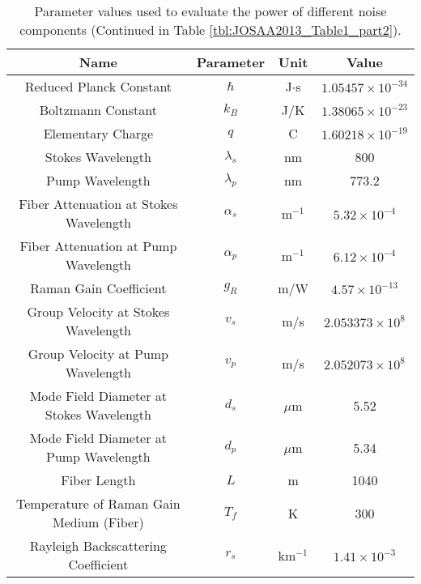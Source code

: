 \begin{table}[t]
\begin{centering}
\begin{tabular}{|c|c|c|c|} \hline
Name & Parameter & Unit & Value\\ \hline\hline
Reduced Planck Constant & $\hbar$ & J$\cdot$s & $1.05457 \times 10^{-34}$ \\ \hline
Boltzmann Constant & $k_B$ & J/K & $1.38065 \times 10^{-23}$  \\ \hline
Elementary Charge & $q$ & C & $1.60218 \times 10^{-19}$  \\ \hline 
Stokes Wavelength & $\lambda_s$ & nm & 800 \\ \hline
Pump Wavelength & $\lambda_p$ & nm & 773.2 \\ \hline
Fiber Attenuation at Stokes Wavelength & $\alpha_s$ & m$^{-1}$ & $5.32 \times 10^{-4}$ \\ \hline
Fiber Attenuation at Pump Wavelength & $\alpha_p$ & m$^{-1}$ & $6.12 \times 10^{-4}$ \\ \hline
Raman Gain Coefficient & $g_R$ & m/W & $4.57 \times 10^{-13}$ \\ \hline
Group Velocity at Stokes Wavelength & $v_s$ & m/s & $2.053373 \times 10^8$ \\ \hline
Group Velocity at Pump Wavelength & $v_p$ & m/s & $2.052073 \times 10^8$ \\ \hline
Mode Field Diameter at Stokes Wavelength & $d_s$ & $\mu$m & 5.52 \\ \hline
Mode Field Diameter at Pump Wavelength & $d_p$ & $\mu$m & 5.34 \\ \hline
Fiber Length & $L$ & m & 1040 \\ \hline
Temperature of Raman Gain Medium (Fiber)& $T_f$ & K & 300 \\ \hline
Rayleigh Backscattering Coefficient & $r_s$ & km$^{-1}$ & $1.41 \times 10^{-3}$ \\ \hline
\end{tabular}
\caption{Parameter values used to evaluate the power of different noise components (Continued in Table \ref{tbl:JOSAA2013_Table1_part2}).}
\label{tbl:JOSAA2013_Table1_part1}
\end{centering}
\end{table}

